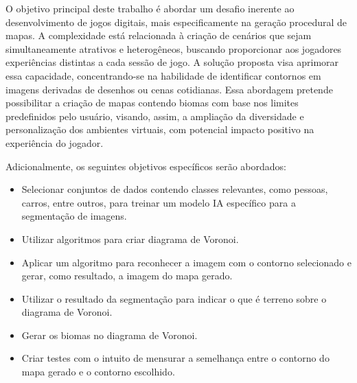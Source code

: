 O objetivo principal deste trabalho é abordar um desafio inerente ao desenvolvimento de jogos digitais, mais especificamente na geração procedural de mapas. A complexidade está relacionada à criação de cenários que sejam simultaneamente atrativos e heterogêneos, buscando proporcionar aos jogadores experiências distintas a cada sessão de jogo. A solução proposta visa aprimorar essa capacidade, concentrando-se na habilidade de identificar contornos em imagens derivadas de desenhos ou cenas cotidianas. Essa abordagem pretende possibilitar a criação de mapas contendo biomas com base nos limites predefinidos pelo usuário, visando, assim, a ampliação da diversidade e personalização dos ambientes virtuais, com potencial impacto positivo na experiência do jogador.

Adicionalmente, os seguintes objetivos específicos serão abordados:

\begin{itemize}
	\item Selecionar conjuntos de dados contendo classes relevantes, como pessoas, carros, entre outros, para treinar um modelo IA específico para a segmentação de imagens.
	\item Utilizar algoritmos para criar diagrama de Voronoi.
	\item Aplicar um algoritmo para reconhecer a imagem com o contorno selecionado e gerar, como resultado, a imagem do mapa gerado.
	\item Utilizar o resultado da segmentação para indicar o que é terreno sobre o diagrama de Voronoi.
	\item Gerar os biomas no diagrama de Voronoi.
	\item Criar testes com o intuito de mensurar a semelhança entre o contorno do mapa gerado e o contorno escolhido.
\end{itemize}